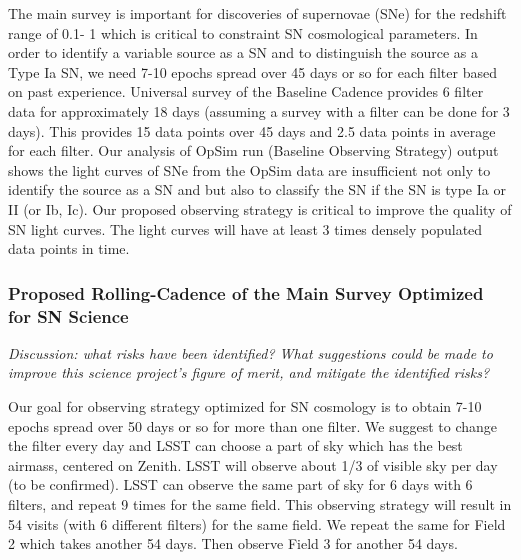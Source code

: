 The main survey is important for discoveries of supernovae (SNe) for the redshift range of
0.1- 1 which is critical to constraint SN cosmological parameters. In order to identify a
variable source as a SN and to distinguish the source as a Type Ia SN, we need 7-10 epochs
spread over 45 days or so for each filter based on past experience. Universal survey of
the Baseline Cadence provides 6 filter data for approximately 18 days (assuming a survey with
a filter can be done for 3 days). This provides 15 data points over 45 days and 2.5 data
points in average for each filter. Our analysis of OpSim run (Baseline Observing Strategy)
output shows the light curves of SNe from the OpSim data are insufficient not only to
identify the source as a SN and but also to classify the SN if the SN is type Ia or II (or
Ib, Ic). Our proposed observing strategy is critical to improve the quality of SN light
curves. The light curves will have at least 3 times densely populated data points in time. 

\subsubsection{Proposed Rolling-Cadence of the Main Survey Optimized for SN Science }


{\it Discussion: what risks have been identified? What suggestions could be
made to improve this science project's figure of merit, and mitigate
the identified risks?}

Our goal for observing strategy optimized for SN cosmology is to
obtain 7-10 epochs spread over 50 days or so for more than one filter. We suggest to
change the filter every day and LSST can choose a part of sky which has the best airmass,
centered on Zenith. LSST will observe about 1/3 of visible sky per day (to be confirmed).
LSST can observe the same part of sky for 6 days with 6 filters, and repeat 9 times for
the same field. This observing strategy will result in 54 visits (with 6 different
filters) for the same field. We repeat the same for Field 2 which takes another 54 days.
Then observe Field 3 for another 54 days.

